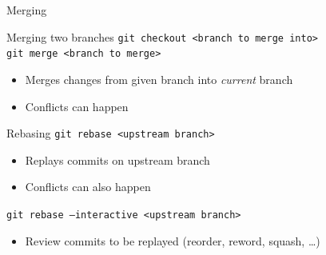 \documentclass{beamer}
\begin{document}
\begin{frame}{Merging}
    \begin{block}{Merging two branches}
      \texttt{git checkout <branch to merge into>}\\
      \texttt{git merge <branch to merge>}
      \begin{itemize}
      \item Merges changes from given branch into \emph{current} branch
      \item Conflicts can happen
      \end{itemize}
    \end{block}
    \begin{block}{Rebasing}
      \texttt{git rebase <upstream branch>}
      \begin{itemize}
      \item Replays commits on upstream branch
      \item Conflicts can also happen
      \end{itemize}
      \texttt{git rebase --interactive <upstream branch>}
      \begin{itemize}
      \item Review commits to be replayed (reorder, reword, squash, \ldots)
      \end{itemize}
    \end{block}
\end{frame}
\end{document}
